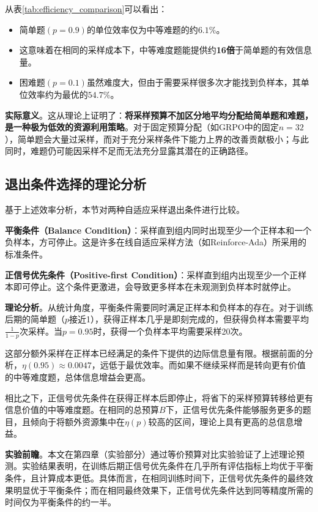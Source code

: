 从表\ref{tab:efficiency_comparison}可以看出：

\begin{itemize}
    \item 简单题$(p = 0.9)$的单位效率仅为中等难题的约$6.1\%$。
    \item 这意味着在相同的采样成本下，中等难度题能提供约\textbf{16倍}于简单题的有效信息量。
    \item 困难题$(p = 0.1)$虽然难度大，但由于需要采样很多次才能找到负样本，其单位效率约为最优的$54.7\%$。
\end{itemize}

\textbf{实际意义}。这从理论上证明了：\textbf{将采样预算不加区分地平均分配给简单题和难题，是一种极为低效的资源利用策略}。对于固定预算分配（如GRPO中的固定$n = 32$），简单题会大量过采样，而对于充分采样条件下能力上界的改善贡献极小；与此同时，难题仍可能因采样不足而无法充分显露其潜在的正确路径。

\subsection{退出条件选择的理论分析}
\label{subsec:exit_condition_analysis}

基于上述效率分析，本节对两种自适应采样退出条件进行比较。

\textbf{平衡条件（Balance Condition）}：采样直到组内同时出现至少一个正样本和一个负样本，方可停止。这是许多在线自适应采样方法（如Reinforce-Ada）所采用的标准条件。

\textbf{正信号优先条件（Positive-first Condition）}：采样直到组内出现至少一个正样本即可停止。这个条件更激进，会导致更多样本在未观测到负样本时就停止。

\textbf{理论分析}。从统计角度，平衡条件需要同时满足正样本和负样本的存在。对于训练后期的简单题（$p$接近1），获得正样本几乎是即刻完成的，但获得负样本需要平均$\frac{1}{1-p}$次采样。当$p = 0.95$时，获得一个负样本平均需要采样20次。

这部分额外采样在正样本已经满足的条件下提供的边际信息量有限。根据前面的分析，$\eta(0.95) \approx 0.0047$，远低于最优效率。而如果不继续采样而是转向更有价值的中等难度题，总体信息增益会更高。

相比之下，正信号优先条件在获得正样本后即停止，将省下的采样预算转移给更有信息价值的中等难度题。在相同的总预算$B$下，正信号优先条件能够服务更多的题目，且倾向于将额外资源集中在$\eta(p)$较高的区间，理论上具有更高的总信息增益。

\textbf{实验前瞻}。本文在第四章（实验部分）通过等价预算对比实验验证了上述理论预测。实验结果表明，在训练后期正信号优先条件在几乎所有评估指标上均优于平衡条件，且计算成本更低。具体而言，在相同训练时间下，正信号优先条件的最终效果明显优于平衡条件；而在相同最终效果下，正信号优先条件达到同等精度所需的时间仅为平衡条件的约一半。

